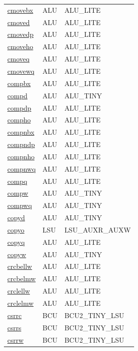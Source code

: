 \begin{small}
\begin{longtable}[l]{l l l}
\hyperlink{lvx.cmovebx}{cmovebx} & ALU & ALU\_LITE \\ 
\hyperlink{lvx.cmoved}{cmoved} & ALU & ALU\_LITE \\ 
\hyperlink{lvx.cmovedp}{cmovedp} & ALU & ALU\_LITE \\ 
\hyperlink{lvx.cmoveho}{cmoveho} & ALU & ALU\_LITE \\ 
\hyperlink{lvx.cmoveq}{cmoveq} & ALU & ALU\_LITE \\ 
\hyperlink{lvx.cmovewq}{cmovewq} & ALU & ALU\_LITE \\ 
\hyperlink{lvx.compbx}{compbx} & ALU & ALU\_LITE \\ 
\hyperlink{lvx.compd}{compd} & ALU & ALU\_TINY \\ 
\hyperlink{lvx.compdp}{compdp} & ALU & ALU\_LITE \\ 
\hyperlink{lvx.compho}{compho} & ALU & ALU\_LITE \\ 
\hyperlink{lvx.compnbx}{compnbx} & ALU & ALU\_LITE \\ 
\hyperlink{lvx.compndp}{compndp} & ALU & ALU\_LITE \\ 
\hyperlink{lvx.compnho}{compnho} & ALU & ALU\_LITE \\ 
\hyperlink{lvx.compnwq}{compnwq} & ALU & ALU\_LITE \\ 
\hyperlink{lvx.compq}{compq} & ALU & ALU\_LITE \\ 
\hyperlink{lvx.compw}{compw} & ALU & ALU\_TINY \\ 
\hyperlink{lvx.compwq}{compwq} & ALU & ALU\_TINY \\ 
\hyperlink{lvx.copyd}{copyd} & ALU & ALU\_TINY \\ 
\hyperlink{lvx.copyo}{copyo} & LSU & LSU\_AUXR\_AUXW \\ 
\hyperlink{lvx.copyq}{copyq} & ALU & ALU\_LITE \\ 
\hyperlink{lvx.copyw}{copyw} & ALU & ALU\_TINY \\ 
\hyperlink{lvx.crcbellw}{crcbellw} & ALU & ALU\_LITE \\ 
\hyperlink{lvx.crcbelmw}{crcbelmw} & ALU & ALU\_LITE \\ 
\hyperlink{lvx.crclellw}{crclellw} & ALU & ALU\_LITE \\ 
\hyperlink{lvx.crclelmw}{crclelmw} & ALU & ALU\_LITE \\ 
\hyperlink{lvx.csrrc}{csrrc} & BCU & BCU2\_TINY\_LSU \\ 
\hyperlink{lvx.csrrs}{csrrs} & BCU & BCU2\_TINY\_LSU \\ 
\hyperlink{lvx.csrrw}{csrrw} & BCU & BCU2\_TINY\_LSU \\ 

\end{longtable}
\end{small}
